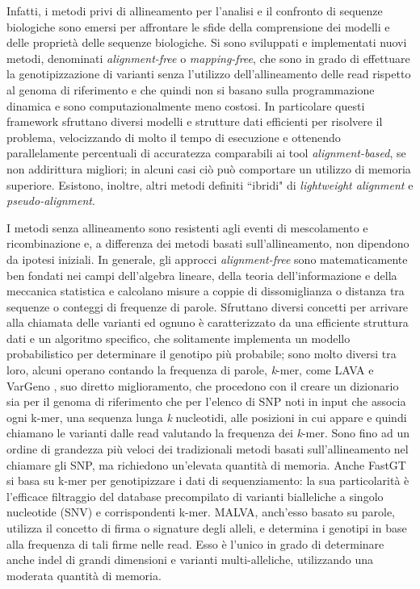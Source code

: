 \documentclass[../main.tex]{subfiles}
\begin{document}
\noindent
Infatti, i metodi privi di allineamento per l'analisi e il confronto di sequenze biologiche sono emersi per affrontare le sfide della comprensione dei modelli e delle proprietà delle sequenze biologiche. Si sono sviluppati e implementati nuovi metodi, denominati \textit{alignment-free} o \textit{mapping-free}, che sono in grado di effettuare la genotipizzazione di varianti senza l'utilizzo dell'allineamento delle read rispetto al genoma di riferimento e che quindi non si basano sulla programmazione dinamica e sono computazionalmente meno costosi. In particolare questi framework sfruttano diversi modelli e strutture dati efficienti per risolvere il problema, velocizzando di molto il tempo di esecuzione e ottenendo parallelamente percentuali di accuratezza comparabili ai tool \textit{alignment-based}, se non addirittura migliori; in alcuni casi ciò può comportare un utilizzo di memoria superiore. Esistono, inoltre, altri metodi definiti ``ibridi" di \textit{lightweight alignment} e \textit{pseudo-alignment}. 

I metodi senza allineamento sono resistenti agli eventi di mescolamento e ricombinazione e, a differenza dei metodi basati sull'allineamento, non dipendono da ipotesi iniziali. In generale, gli approcci \textit{alignment-free} sono matematicamente ben fondati nei campi dell'algebra lineare, della teoria dell'informazione e della meccanica statistica e calcolano misure a coppie di dissomiglianza o distanza tra sequenze o conteggi di frequenze di parole. Sfruttano diversi concetti per arrivare alla chiamata delle varianti ed ognuno è caratterizzato da una efficiente struttura dati e un algoritmo specifico, che solitamente implementa un modello probabilistico per determinare il genotipo più probabile; sono molto diversi tra loro, alcuni operano contando la frequenza di parole, \textit{k}-mer, come LAVA \cite{shajii2016lava} e VarGeno \cite{sun-medvedev2018vargeno}, suo diretto miglioramento, che procedono con il creare un dizionario sia per il genoma di riferimento che per l'elenco di SNP noti in input che associa ogni k-mer, una sequenza lunga \textit{k} nucleotidi, alle posizioni in cui appare e quindi chiamano le varianti dalle read valutando la frequenza dei \textit{k}-mer. Sono fino ad un ordine di grandezza più veloci dei tradizionali metodi basati sull'allineamento nel chiamare gli SNP, ma richiedono un'elevata quantità di memoria. Anche FastGT \cite{pajuste2017fastgt} si basa su k-mer per genotipizzare i dati di sequenziamento: la sua particolarità è l'efficace filtraggio del database precompilato di varianti bialleliche a singolo nucleotide (SNV) e corrispondenti k-mer. MALVA, anch'esso basato su parole, utilizza il concetto di firma o signature degli alleli, e determina i genotipi in base alla frequenza di tali firme nelle read. Esso è l'unico in grado di determinare anche indel di grandi dimensioni e varianti multi-alleliche, utilizzando una moderata quantità di memoria.
\end{document}
